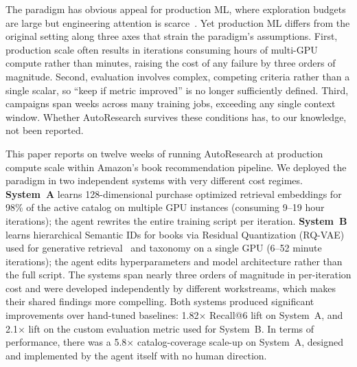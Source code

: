 \documentclass[conference]{IEEEtran}
\begin{document}
The paradigm has obvious appeal for production ML, where exploration budgets are large but engineering attention is scarce~\cite{sculley2015debt}. Yet production ML differs from the original setting along three axes that strain the paradigm's assumptions. First, production scale often results in iterations consuming hours of multi-GPU compute rather than minutes, raising the cost of any failure by three orders of magnitude. Second, evaluation involves complex, competing criteria rather than a single scalar, so ``keep if metric improved'' is no longer sufficiently defined. Third, campaigns span weeks across many training jobs, exceeding any single context window. Whether AutoResearch survives these conditions has, to our knowledge, not been reported.

This paper reports on twelve weeks of running AutoResearch at production compute scale within Amazon's book recommendation pipeline. We deployed the paradigm in two independent systems with very different cost regimes. \textbf{System~A} learns 128-dimensional purchase optimized retrieval embeddings for 98\% of the active catalog on multiple GPU instances (consuming 9--19 hour iterations); the agent rewrites the entire training script per iteration. \textbf{System~B} learns hierarchical Semantic IDs for books via Residual Quantization (RQ-VAE)~\cite{zeghidour2021soundstream,vandenoord2017vqvae} used for generative retrieval~\cite{rajput2024genret} and taxonomy on a single GPU (6--52 minute iterations); the agent edits hyperparameters and model architecture rather than the full script. The systems span nearly three orders of magnitude in per-iteration cost and were developed independently by different workstreams, which makes their shared findings more compelling. Both systems produced significant improvements over hand-tuned baselines: 1.82$\times$ Recall@6 lift on System~A, and 2.1$\times$ lift on the custom evaluation metric used for System~B. In terms of performance, there was a 5.8$\times$ catalog-coverage scale-up on System~A, designed and implemented by the agent itself with no human direction.
\end{document}

